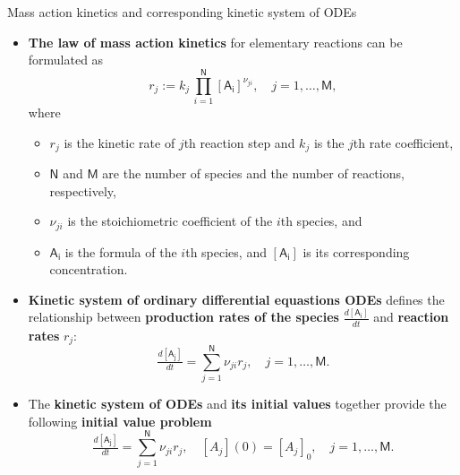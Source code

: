 \begin{frame}{Mass action kinetics and corresponding kinetic system of ODEs}
	\footnotesize
	\begin{itemize}
		\item \alert{\bf The law of mass action kinetics} for elementary reactions can be formulated as
		\[r_j := k_j \, \prod_{i=1}^{\mathsf{N}} \mathsf{[A_i]}^{\nu_{ji}}, \quad j = 1, \ldots, \mathsf{M}, \]
		\vskip -10pt
		where 
		\begin{itemize}
			\item $r_j $ is the kinetic rate of $j$th reaction step and $k_j$ is the $j$th rate coefficient, 
			\item $\mathsf{N}$ and $\mathsf{M}$ are the number of species and  the number of reactions, respectively, 
			\item $\nu_{ji}$ is the stoichiometric coefficient of the $i$th species, and 
			\item  $\mathsf{A_i}$ is the formula of the $i$th species, and $[\mathsf{A_i}]$ is its corresponding concentration.
		\end{itemize} 
	\pause
	\item \alert{\bf Kinetic system of ordinary differential equastions ODEs} defines the relationship between 
	{\bf production rates of the species} $\tfrac{d \mathsf{[A_i]}}{dt}$ and {\bf reaction rates} $r_j$:
	\[
	\tfrac{d \mathsf{[A_j]}}{dt} = \sum_{j=1}^{\mathsf{N}} \nu_{ji} r_j, \quad j = 1, \ldots, \mathsf{M}.
	\]
	\vskip -5pt
	\pause
	\item The {\bf kinetic system of ODEs} and {\bf its initial values} together provide the following
	\alert{\bf initial value problem}
	\[
	\tfrac{d \mathsf{[A_j]}}{dt} = \sum_{j=1}^{\mathsf{N}} \nu_{ji} r_j, 
	\quad [A_j](0) = [A_j]_0,
	\quad j = 1, \ldots, \mathsf{M}.
	\]
	\end{itemize}
\end{frame}
%
%
